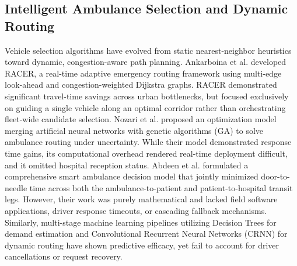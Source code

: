 \documentclass[conference]{IEEEtran}
\begin{document}
\subsection{Intelligent Ambulance Selection and Dynamic Routing}
Vehicle selection algorithms have evolved from static nearest-neighbor heuristics toward dynamic, congestion-aware path planning. Ankarboina et al. \cite{ankarboina2026racer} developed RACER, a real-time adaptive emergency routing framework using multi-edge look-ahead and congestion-weighted Dijkstra graphs. RACER demonstrated significant travel-time savings across urban bottlenecks, but focused exclusively on guiding a single vehicle along an optimal corridor rather than orchestrating fleet-wide candidate selection. Nozari et al. \cite{nozari2025designing} proposed an optimization model merging artificial neural networks with genetic algorithms (GA) to solve ambulance routing under uncertainty. While their model demonstrated response time gains, its computational overhead rendered real-time deployment difficult, and it omitted hospital reception status. Abdeen et al. \cite{abdeen2022novel} formulated a comprehensive smart ambulance decision model that jointly minimized door-to-needle time across both the ambulance-to-patient and patient-to-hospital transit legs. However, their work was purely mathematical and lacked field software applications, driver response timeouts, or cascading fallback mechanisms. Similarly, multi-stage machine learning pipelines utilizing Decision Trees for demand estimation and Convolutional Recurrent Neural Networks (CRNN) for dynamic routing have shown predictive efficacy, yet fail to account for driver cancellations or request recovery.
\end{document}
